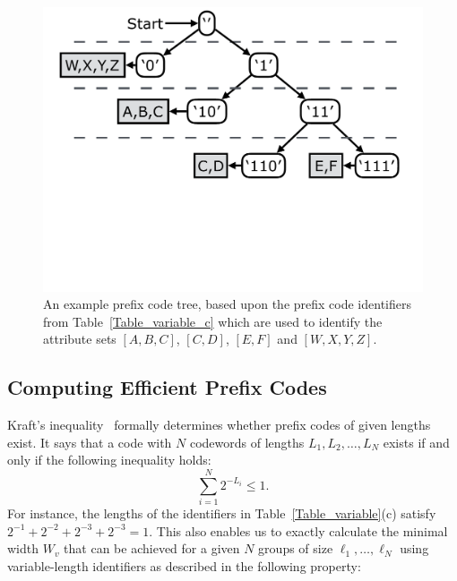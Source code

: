 \begin{figure}[t!] 
\begin{minipage}{1\linewidth}
\includegraphics[trim={0 10cm 0 0}, clip, width=\linewidth]{figures/code_tree}
\end{minipage} 
\caption{An example prefix code tree, based upon the prefix code identifiers from Table~\ref{Table_variable_c} which are used to identify the attribute sets $[A,B,C]$, $[C,D]$, $[E,F]$ and $[W,X,Y,Z]$. }
\label{fig:code_tree}
\end{figure}

\subsection{Computing Efficient Prefix Codes}
Kraft's inequality~\cite{abramson} formally determines whether prefix
codes of given lengths exist.  It says that a code with $N$ codewords
of lengths $L_1, L_2, \ldots, L_N$ exists if and only if the following
inequality holds:
$$ \sum_{i = 1}^{N}{2^{-L_i}} \le 1. $$
%
For instance, the lengths of the identifiers in
Table~\ref{Table_variable}(c) 
satisfy $2^{-1} + 2^{-2} + 2^{-3} + 2^{-3} = 1$.
%
This also enables us to exactly calculate the minimal width $W_{v}$
that can be achieved for a given $N$ groups of size $\ell_1,
\ldots, \ell_N$ using variable-length identifiers as described in the
following property:

